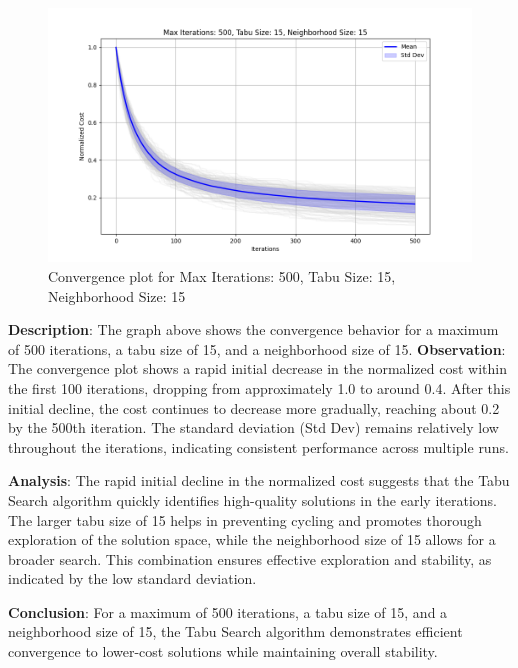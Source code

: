 \documentclass{article}
\begin{document}
    \begin{figure}[H]
        \centering
        \includegraphics{tabu_search/max_iter_500_tabu_size_15_neighborhood_size_15}
        \caption{Convergence plot for Max Iterations: 500, Tabu Size: 15, Neighborhood Size: 15}
        \label{fig:ts_500_15_15}
    \end{figure}

    \textbf{Description}: The graph above shows the convergence behavior for a maximum of 500 iterations, a tabu size of 15, and a neighborhood size of 15.
    \textbf{Observation}: The convergence plot shows a rapid initial decrease in the normalized cost within the first 100 iterations, dropping from approximately 1.0 to around 0.4. After this initial decline, the cost continues to decrease more gradually, reaching about 0.2 by the 500th iteration. The standard deviation (Std Dev) remains relatively low throughout the iterations, indicating consistent performance across multiple runs.

    \textbf{Analysis}: The rapid initial decline in the normalized cost suggests that the Tabu Search algorithm quickly identifies high-quality solutions in the early iterations. The larger tabu size of 15 helps in preventing cycling and promotes thorough exploration of the solution space, while the neighborhood size of 15 allows for a broader search. This combination ensures effective exploration and stability, as indicated by the low standard deviation.

    \textbf{Conclusion}: For a maximum of 500 iterations, a tabu size of 15, and a neighborhood size of 15, the Tabu Search algorithm demonstrates efficient convergence to lower-cost solutions while maintaining overall stability.
\end{document}
